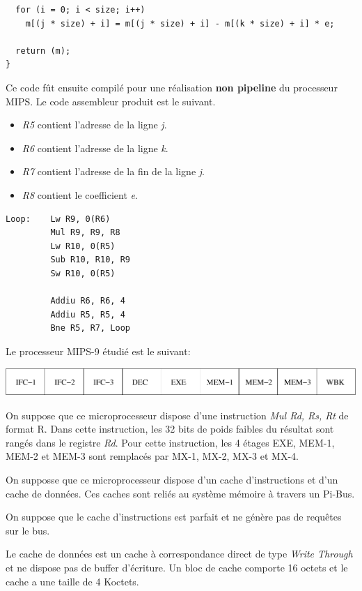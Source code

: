 {\begin{verbatim}
  for (i = 0; i < size; i++)
    m[(j * size) + i] = m[(j * size) + i] - m[(k * size) + i] * e;

  return (m);
}
\end{verbatim}

Ce code f\^ut ensuite compil\'e pour une r\'ealisation \textbf{non pipeline}
du processeur MIPS. Le code assembleur produit est le suivant.

\begin{itemize}
  \item
    \textit{R5} contient l'adresse de la ligne \textit{j}.
  \item
    \textit{R6} contient l'adresse de la ligne \textit{k}.
  \item
    \textit{R7} contient l'adresse de la fin de la ligne \textit{j}.
  \item
    \textit{R8} contient le coefficient \textit{e}.
\end{itemize}

\begin{verbatim}
Loop:    Lw R9, 0(R6)
         Mul R9, R9, R8
         Lw R10, 0(R5)
         Sub R10, R10, R9
         Sw R10, 0(R5)

         Addiu R6, R6, 4
         Addiu R5, R5, 4
         Bne R5, R7, Loop
\end{verbatim}

Le processeur MIPS-9 \'etudi\'e est le suivant:

\begin{center}
  \includegraphics[scale=0.6]{figures/pipeline.pdf}
\end{center}

On suppose que ce microprocesseur dispose d'une instruction
\textit{Mul Rd, Rs, Rt} de format R. Dans cette instruction, les 32 bits
de poids faibles du r\'esultat sont rang\'es dans le registre \textit{Rd}.
Pour cette instruction, les 4 \'etages EXE, MEM-1, MEM-2 et MEM-3 sont
remplac\'es par MX-1, MX-2, MX-3 et MX-4.

On supposse que ce microprocesseur dispose d'un cache d'instructions et d'un
cache de donn\'ees. Ces caches sont reli\'es au syst\`eme m\'emoire \`a
travers un Pi-Bus.

On suppose que le cache d'instructions est parfait et ne g\'en\`ere pas de
requ\^etes sur le bus.

Le cache de donn\'ees est un cache \`a correspondance direct de type
\textit{Write Through} et ne dispose pas de buffer d'\'ecriture. Un bloc
de cache comporte 16 octets et le cache a une taille de 4 Koctets.

}
